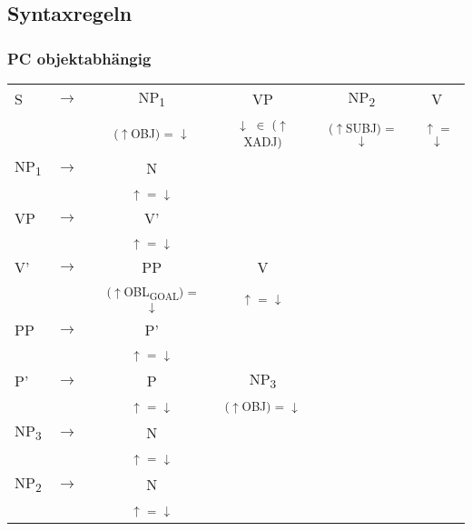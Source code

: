 \documentclass[12pt,a4paper]{article}
\begin{document}











\subsection{Syntaxregeln}


\subsubsection{PC objektabhängig}

\begin{singlespace}
\begin{tabular}{ l  l  c  c  c  c }
S & $\rightarrow$ & NP\textsubscript{1} & VP & NP\textsubscript{2} & V\\
   & $\qquad$ & \textsuperscript{($\uparrow$OBJ) = $\downarrow$} & \textsuperscript{$\downarrow$ $\in$ ($\uparrow$XADJ)} & \textsuperscript{($\uparrow$SUBJ) = $\downarrow$} & \textsuperscript{$\uparrow$ = $\downarrow$} \\
    NP\textsubscript{1} & $\rightarrow$ & N \\
   & $\qquad$ & \textsuperscript{$\uparrow$ = $\downarrow$} \\
    VP & $\rightarrow$ & V' \\
   & $\qquad$ & \textsuperscript{$\uparrow$ = $\downarrow$} \\
  	  V' & $\rightarrow$ & PP & V & \\
   & $\qquad$ & \textsuperscript{($\uparrow$OBL\textsubscript{GOAL}) = $\downarrow$ } & \textsuperscript{$\uparrow$ = $\downarrow$} \\
   		 PP & $\rightarrow$ & P' \\
	& $\qquad$   & \textsuperscript{$\uparrow$ = $\downarrow$} \\
    		P' & $\rightarrow$ & P & NP\textsubscript{3} \\
   & $\qquad$ & \textsuperscript{$\uparrow$ = $\downarrow$} & \textsuperscript{($\uparrow$OBJ) = $\downarrow$} \\
 		   NP\textsubscript{3} & $\rightarrow$ & N \\
   & $\qquad$ & \textsuperscript{$\uparrow$ = $\downarrow$} \\
    NP\textsubscript{2} & $\rightarrow$ & N \\
   & $\qquad$ & \textsuperscript{$\uparrow$ = $\downarrow$} \\
\end{tabular}\\
\end{singlespace}
\end{document}
